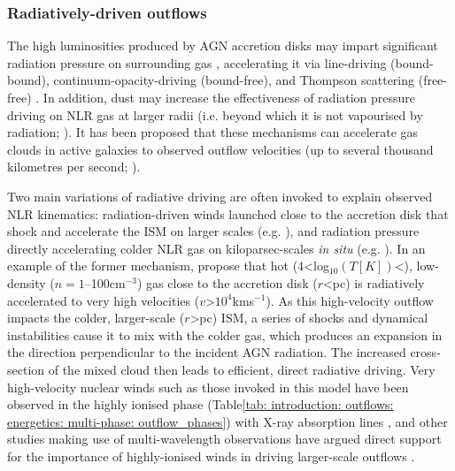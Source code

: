 \subsubsection{Radiatively-driven outflows}
\label{section: introduction: outflows: accleration_mechanisms: radiation}

The high luminosities produced by AGN accretion disks may impart significant radiation pressure on surrounding gas \citep{Castor1975, Abbott1982}, accelerating it via line-driving (bound-bound), continuum-opacity-driving (bound-free), and Thompson scattering (free-free) \citep{Arav1994, Murray1995, Proga1998, Proga2000}. In addition, dust may increase the effectiveness of radiation pressure driving on NLR gas at larger radii (i.e. beyond which it is not vapourised by radiation; \citealt{Dopita2002, Fabian2006}). It has been proposed that these mechanisms can accelerate gas clouds in active galaxies to observed outflow velocities (up to several thousand kilometres per second; \citealt{Crenshaw2000_N1068, Crenshaw2000_N4151, King2003, Das2005, Das2006, Hopkins2010, King2010, MullerSanchez2011, Meena2021}). 

Two main variations of radiative driving are often invoked to explain observed NLR kinematics: radiation-driven winds launched close to the accretion disk that shock and accelerate the ISM on larger scales (e.g. \citealt{Elvis2000, Proga2000, King2003}), and radiation pressure directly accelerating colder NLR gas on kiloparsec-scales \textit{in situ} (e.g. \citealt{Das2007, Fischer2017, Revalski2018, Meena2021, Meena2023}). In an example of the former mechanism, \citet{Hopkins2010} propose that hot (4\;\textless\;log$_{10}(T [K])$\;\textless{}), low-density ($n=1$--100\;cm$^{-3}$) gas close to the accretion disk ($r$\;\textless{}\;pc) is radiatively accelerated to very high velocities ($v$\;\textgreater\;$10^4$\;km\;s\;$^{-1}$). As this high-velocity outflow impacts the colder, larger-scale ($r$\;\textgreater{}\;pc) ISM, a series of shocks and dynamical instabilities cause it to mix with the colder gas, which produces an expansion in the direction perpendicular to the incident AGN radiation. The increased cross-section of the mixed cloud then leads to efficient, direct radiative driving. Very high-velocity nuclear winds such as those invoked in this model have been observed in the highly ionised phase (Table\;\ref{tab: introduction: outflows: energetics: multi-phase: outflow_phases}) with X-ray absorption lines \citep{Pounds2004, Lobban2011, Pounds2011, Tombesi2011}, and other studies making use of multi-wavelength observations have argued direct support for the importance of highly-ionised winds in driving larger-scale outflows \citep{Pounds2013, Feruglio2015}.

